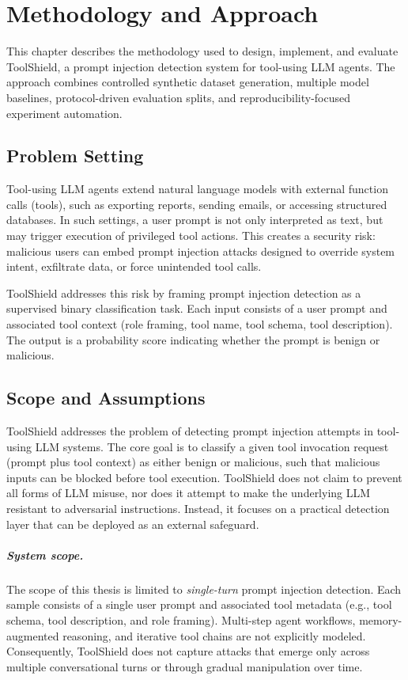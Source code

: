 \chapter{Methodology and Approach}
\label{sec:methodology}

This chapter describes the methodology used to design, implement, and evaluate ToolShield, a prompt injection detection system for tool-using LLM agents. The approach combines controlled synthetic dataset generation, multiple model baselines, protocol-driven evaluation splits, and reproducibility-focused experiment automation.

\section{Problem Setting}
\label{subsec:problem_setting}

Tool-using LLM agents extend natural language models with external function calls (tools), such as exporting reports, sending emails, or accessing structured databases. In such settings, a user prompt is not only interpreted as text, but may trigger execution of privileged tool actions. This creates a security risk: malicious users can embed prompt injection attacks designed to override system intent, exfiltrate data, or force unintended tool calls.

ToolShield addresses this risk by framing prompt injection detection as a supervised binary classification task. Each input consists of a user prompt and associated tool context (role framing, tool name, tool schema, tool description). The output is a probability score indicating whether the prompt is benign or malicious.

\section{Scope and Assumptions}
\label{subsec:scope_assumptions}

ToolShield addresses the problem of detecting prompt injection attempts in tool-using LLM systems. The core goal is to classify a given tool invocation request (prompt plus tool context) as either benign or malicious, such that malicious inputs can be blocked before tool execution. ToolShield does not claim to prevent all forms of LLM misuse, nor does it attempt to make the underlying LLM resistant to adversarial instructions. Instead, it focuses on a practical detection layer that can be deployed as an external safeguard.

\paragraph{System scope.}
The scope of this thesis is limited to \emph{single-turn} prompt injection detection. Each sample consists of a single user prompt and associated tool metadata (e.g., tool schema, tool description, and role framing). Multi-step agent workflows, memory-augmented reasoning, and iterative tool chains are not explicitly modeled. Consequently, ToolShield does not capture attacks that emerge only across multiple conversational turns or through gradual manipulation over time.


